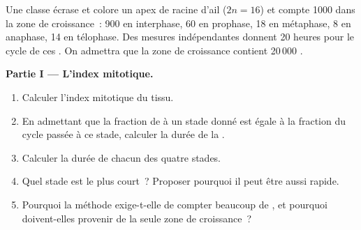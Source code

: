 \begin{problem}
\label{pb:g11:cell-cycle-mitosis:1}
Une classe écrase et colore un apex de racine d'ail ($2n = 16$) et
compte 1000  dans la zone de croissance~: 900 en interphase, 60
en prophase, 18 en métaphase, 8 en anaphase, 14 en télophase. Des
mesures indépendantes donnent 20 heures pour le cycle de ces .
On admettra que la zone de croissance contient 20\,000 .

\medskip
\noindent\textbf{Partie I --- L'index mitotique.}
\begin{enumerate}
  \item Calculer l'index mitotique du tissu.
  \item En admettant que la fraction de  à un stade donné est
        égale à la fraction du cycle passée à ce stade, calculer la
        durée de la .
  \item Calculer la durée de chacun des quatre stades.
  \item Quel stade est le plus court~? Proposer pourquoi il peut être
        aussi rapide.
  \item Pourquoi la méthode exige-t-elle de compter beaucoup de
        , et pourquoi doivent-elles provenir de la seule zone
        de croissance~?
\end{enumerate}


\end{problem}
